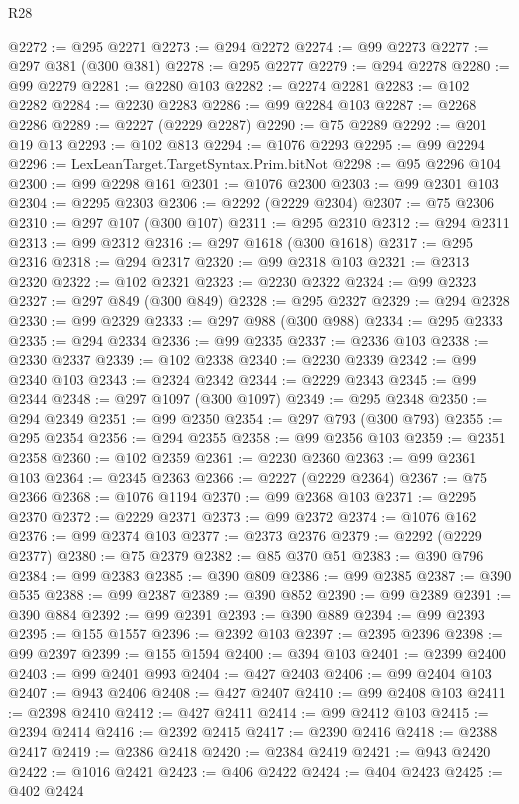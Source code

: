 \begin{lexlean}{R28}
\begin{coremodule}
@2272 := @295 @2271
@2273 := @294 @2272
@2274 := @99 @2273
@2277 := @297 @381 (@300 @381)
@2278 := @295 @2277
@2279 := @294 @2278
@2280 := @99 @2279
@2281 := @2280 @103
@2282 := @2274 @2281
@2283 := @102 @2282
@2284 := @2230 @2283
@2286 := @99 @2284 @103
@2287 := @2268 @2286
@2289 := @2227 (@2229 @2287)
@2290 := @75 @2289
@2292 := @201 @19 @13
@2293 := @102 @813
@2294 := @1076 @2293
@2295 := @99 @2294
@2296 := LexLeanTarget.TargetSyntax.Prim.bitNot
@2298 := @95 @2296 @104
@2300 := @99 @2298 @161
@2301 := @1076 @2300
@2303 := @99 @2301 @103
@2304 := @2295 @2303
@2306 := @2292 (@2229 @2304)
@2307 := @75 @2306
@2310 := @297 @107 (@300 @107)
@2311 := @295 @2310
@2312 := @294 @2311
@2313 := @99 @2312
@2316 := @297 @1618 (@300 @1618)
@2317 := @295 @2316
@2318 := @294 @2317
@2320 := @99 @2318 @103
@2321 := @2313 @2320
@2322 := @102 @2321
@2323 := @2230 @2322
@2324 := @99 @2323
@2327 := @297 @849 (@300 @849)
@2328 := @295 @2327
@2329 := @294 @2328
@2330 := @99 @2329
@2333 := @297 @988 (@300 @988)
@2334 := @295 @2333
@2335 := @294 @2334
@2336 := @99 @2335
@2337 := @2336 @103
@2338 := @2330 @2337
@2339 := @102 @2338
@2340 := @2230 @2339
@2342 := @99 @2340 @103
@2343 := @2324 @2342
@2344 := @2229 @2343
@2345 := @99 @2344
@2348 := @297 @1097 (@300 @1097)
@2349 := @295 @2348
@2350 := @294 @2349
@2351 := @99 @2350
@2354 := @297 @793 (@300 @793)
@2355 := @295 @2354
@2356 := @294 @2355
@2358 := @99 @2356 @103
@2359 := @2351 @2358
@2360 := @102 @2359
@2361 := @2230 @2360
@2363 := @99 @2361 @103
@2364 := @2345 @2363
@2366 := @2227 (@2229 @2364)
@2367 := @75 @2366
@2368 := @1076 @1194
@2370 := @99 @2368 @103
@2371 := @2295 @2370
@2372 := @2229 @2371
@2373 := @99 @2372
@2374 := @1076 @162
@2376 := @99 @2374 @103
@2377 := @2373 @2376
@2379 := @2292 (@2229 @2377)
@2380 := @75 @2379
@2382 := @85 @370 @51
@2383 := @390 @796
@2384 := @99 @2383
@2385 := @390 @809
@2386 := @99 @2385
@2387 := @390 @535
@2388 := @99 @2387
@2389 := @390 @852
@2390 := @99 @2389
@2391 := @390 @884
@2392 := @99 @2391
@2393 := @390 @889
@2394 := @99 @2393
@2395 := @155 @1557
@2396 := @2392 @103
@2397 := @2395 @2396
@2398 := @99 @2397
@2399 := @155 @1594
@2400 := @394 @103
@2401 := @2399 @2400
@2403 := @99 @2401 @993
@2404 := @427 @2403
@2406 := @99 @2404 @103
@2407 := @943 @2406
@2408 := @427 @2407
@2410 := @99 @2408 @103
@2411 := @2398 @2410
@2412 := @427 @2411
@2414 := @99 @2412 @103
@2415 := @2394 @2414
@2416 := @2392 @2415
@2417 := @2390 @2416
@2418 := @2388 @2417
@2419 := @2386 @2418
@2420 := @2384 @2419
@2421 := @943 @2420
@2422 := @1016 @2421
@2423 := @406 @2422
@2424 := @404 @2423
@2425 := @402 @2424

\end{coremodule}
\end{lexlean}
